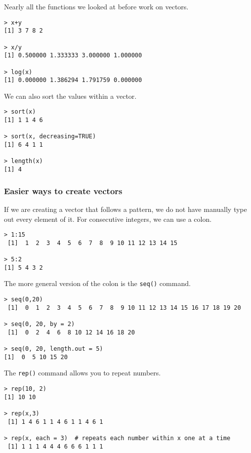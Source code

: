 \vspace*{0.5cm}

Nearly all the functions we looked at before work on vectors.

\begin{lstlisting}
> x+y
[1] 3 7 8 2

> x/y
[1] 0.500000 1.333333 3.000000 1.000000

> log(x)
[1] 0.000000 1.386294 1.791759 0.000000
\end{lstlisting}

We can also sort the values within a vector.

\begin{lstlisting}
> sort(x)
[1] 1 1 4 6

> sort(x, decreasing=TRUE)
[1] 6 4 1 1

> length(x)
[1] 4
\end{lstlisting}

\subsubsection*{Easier ways to create vectors}

If we are creating a vector that follows a pattern, we do not have manually type out every element of it. For consecutive integers, we can use a colon.

\begin{lstlisting}
> 1:15
 [1]  1  2  3  4  5  6  7  8  9 10 11 12 13 14 15
 
> 5:2
[1] 5 4 3 2
\end{lstlisting}

The more general version of the colon is the \verb|seq()| command.

\begin{lstlisting}
> seq(0,20)
 [1]  0  1  2  3  4  5  6  7  8  9 10 11 12 13 14 15 16 17 18 19 20
 
> seq(0, 20, by = 2)
 [1]  0  2  4  6  8 10 12 14 16 18 20
 
> seq(0, 20, length.out = 5)
[1]  0  5 10 15 20
\end{lstlisting}

The \verb|rep()| command allows you to repeat numbers.

\begin{lstlisting}
> rep(10, 2)
[1] 10 10

> rep(x,3)
 [1] 1 4 6 1 1 4 6 1 1 4 6 1
 
> rep(x, each = 3)  # repeats each number within x one at a time
 [1] 1 1 1 4 4 4 6 6 6 1 1 1
\end{lstlisting}

